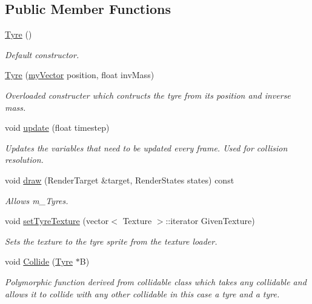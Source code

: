 \subsection*{Public Member Functions}
\begin{DoxyCompactItemize}
\item 
\hyperlink{class_tyre_a162dbaad7ae74443df530dfb147fb694}{Tyre} ()
\begin{DoxyCompactList}\small\item\em Default constructor. \end{DoxyCompactList}\item 
\hyperlink{class_tyre_a1908351bf7262df0b42b24f036af21ac}{Tyre} (\hyperlink{classmy_vector}{my\+Vector} position, float inv\+Mass)
\begin{DoxyCompactList}\small\item\em Overloaded constructer which contructs the tyre from its position and inverse mass. \end{DoxyCompactList}\item 
void \hyperlink{class_tyre_abdcd021058ef1c1821f472f79835e4ab}{update} (float timestep)
\begin{DoxyCompactList}\small\item\em Updates the variables that need to be updated every frame. Used for collision resolution. \end{DoxyCompactList}\item 
void \hyperlink{class_tyre_ae42e42ec7c444b97602fc4cda9f83480}{draw} (Render\+Target \&target, Render\+States states) const 
\begin{DoxyCompactList}\small\item\em Allows m\+\_\+\+Tyres. \end{DoxyCompactList}\item 
void \hyperlink{class_tyre_ab66f2659c2384b6c608b5eb51bb50425}{set\+Tyre\+Texture} (vector$<$ Texture $>$\+::iterator Given\+Texture)
\begin{DoxyCompactList}\small\item\em Sets the texture to the tyre sprite from the texture loader. \end{DoxyCompactList}\item 
void \hyperlink{class_tyre_afc0a9733f7b94042a08be61e25e2d4d3}{Collide} (\hyperlink{class_tyre}{Tyre} $\ast$B)
\begin{DoxyCompactList}\small\item\em Polymorphic function derived from collidable class which takes any collidable and allows it to collide with any other collidable in this case a tyre and a tyre. \end{DoxyCompactList}\end{DoxyCompactItemize}
